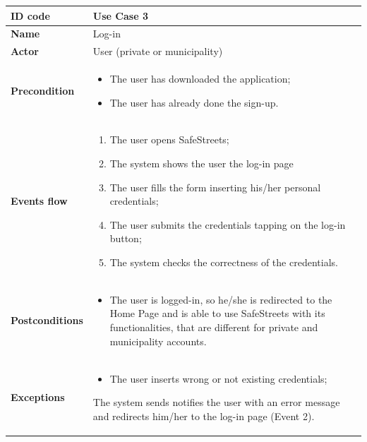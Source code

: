 \documentclass[titlepage]{article}
\begin{document}
\begin{longtable}{| p{3 cm} | p{10 cm} |} 
\hline


\textbf{ID code} & Use Case 3 \\ \hline
\textbf{Name} & Log-in \\ \hline
\textbf{Actor} & User (private or municipality) \\ \hline
\textbf{Precondition} & 
\begin{itemize}
\item The user has downloaded the application;
\item The user has already done the sign-up.
\end{itemize} \\ \hline

\textbf{Events flow} & 
\begin{enumerate}
\item The user opens SafeStreets;
\item The system shows the user the log-in page
\item The user fills the form inserting his/her personal credentials;
\item The user submits the credentials tapping on the log-in button;
\item The system checks the correctness of the credentials.
\end{enumerate} \\ \hline

\textbf{Postconditions} & 
\begin{itemize}
\item The user is logged-in, so he/she is redirected to the Home Page and is able to use SafeStreets with its functionalities, that are different for private and municipality accounts. 
\end{itemize} \\ \hline

\textbf{Exceptions} &
\begin{itemize}
\item The user inserts wrong or not existing credentials;
\end{itemize}
The system sends notifies the user with an error message and redirects him/her to the log-in page (Event 2).
\\ \hline

\end{longtable}

\newpage
\end{document}

